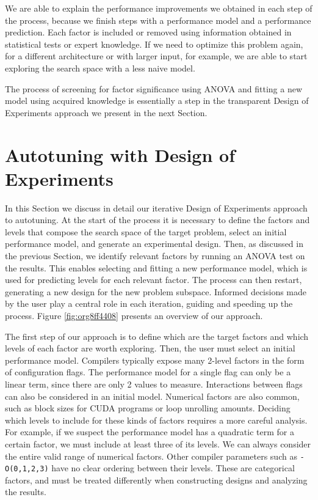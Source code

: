 \documentclass[conference]{IEEEtran}
\begin{document}
We are able to explain the performance improvements we obtained in each step of
the process, because we finish steps with a performance model and a performance
prediction. Each factor is included or removed using information obtained in
statistical tests or expert knowledge. If we need to optimize this problem
again, for a different architecture or with larger input, for example, we are
able to start exploring the search space with a less naive model.

The process of screening for factor significance using ANOVA and fitting a
new model using acquired knowledge is essentially a step in the transparent
Design of Experiments approach we present in the next Section.
\section{Autotuning with Design of Experiments}
\label{sec:org4683d70}
In this Section we discuss in detail our iterative Design of Experiments
approach to autotuning. At the start of the process it is necessary to define
the factors and levels that compose the search space of the target problem,
select an initial performance model, and generate an experimental design. Then,
as discussed in the previous Section, we identify relevant factors by running an
ANOVA test on the results. This enables selecting and fitting a new performance
model, which is used for predicting levels for each relevant factor. The process
can then restart, generating a new design for the new problem subspace. Informed
decisions made by the user play a central role in each iteration, guiding and
speeding up the process. Figure \ref{fig:org8ff4408} presents an overview of
our approach.

The first step of our approach is to define which are the target factors and
which levels of each factor are worth exploring. Then, the user must select an
initial performance model. Compilers typically expose many 2-level factors in
the form of configuration flags. The performance model for a single flag can
only be a linear term, since there are only 2 values to measure. Interactions
between flags can also be considered in an initial model. Numerical factors are
also common, such as block sizes for CUDA programs or loop unrolling amounts.
Deciding which levels to include for these kinds of factors requires a more
careful analysis. For example, if we suspect the performance model has a
quadratic term for a certain factor, we must include at least three of its
levels. We can always consider the entire valid range of numerical factors.
Other compiler parameters such as \texttt{-O(0,1,2,3)} have no clear ordering
between their levels. These are categorical factors, and must be treated
differently when constructing designs and analyzing the results.
\end{document}
